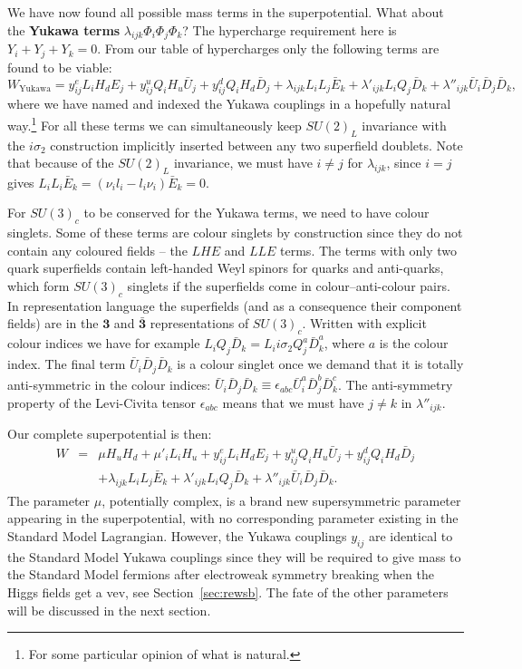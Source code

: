 \documentclass[notes.tex]{subfiles}
\begin{document}
We have now found all possible mass terms in the superpotential. What about the {\bf Yukawa terms} $\lambda_{ijk}\Phi_i\Phi_j\Phi_k$? The hypercharge requirement here is $Y_i + Y_j + Y_k = 0$. From our table of hypercharges only the following terms are found to be viable:
\[W_\text{Yukawa}=y^e_{ij}L_iH_d E_j + y^u_{ij}Q_iH_u\bar{U}_j +  y^d_{ij}Q_iH_d\bar{D}_j+ \lambda_{ijk} L_iL_j\bar{E}_k + \lambda'_{ijk} L_iQ_j\bar{D}_k + \lambda''_{ijk}\bar{U}_i\bar{D}_j\bar{D}_k,\]
where we have named and indexed the Yukawa couplings in a hopefully natural way.\footnote{For some particular opinion of what is natural.} 
For all these terms we can simultaneously keep $SU(2)_L$ invariance with the $i\sigma_2$ construction implicitly inserted between any two superfield doublets.  Note that because of the $SU(2)_L$  invariance, we must have $i\ne j$ for  $\lambda_{ijk}$, since $i=j$ gives $ L_iL_i\bar{E}_k =(\nu_i l_i- l_i\nu_i)\bar E_k=0$.

For $SU(3)_c$ to be conserved for the Yukawa terms, we need to have colour singlets. Some of these terms are colour singlets by construction since they do not contain any coloured fields -- the $LHE$ and $LLE$ terms. The terms with only two quark superfields contain left-handed Weyl spinors for quarks and anti-quarks, which form $SU(3)_c$ singlets if the superfields come in colour--anti-colour pairs. In representation language the superfields (and as a consequence their component fields) are in the $\mathbf 3$ and $\mathbf{\bar 3}$ representations of $SU(3)_c$. Written with explicit  colour indices we have for example $L_i Q_j \bar{D}_k= L_i i\sigma_2 Q_j^a \bar{D}_k^a$, where $a$ is the colour index. The final term $\bar{U}_i\bar{D}_j\bar{D}_k$ is a colour singlet once we demand that it is totally anti-symmetric in the colour indices: $\bar{U}_i\bar{D}_j\bar{D}_k\equiv\epsilon_{abc}\bar{U}_i^a\bar{D}_j^b\bar{D}_k^c$. The anti-symmetry property of the Levi-Civita tensor $\epsilon_{abc}$ means that we must have $j\ne k$ in $ \lambda''_{ijk}$.

Our complete superpotential is then:
\begin{eqnarray}
\label{eq:supolag}
W &=& \mu H_u H_d + \mu'_i L_iH_u + y^e_{ij}L_iH_d E_j + y^u_{ij}Q_iH_u\bar{U}_j +  y^d_{ij}Q_iH_d\bar{D}_j \nonumber\\
&&+ \lambda_{ijk} L_iL_j\bar{E}_k + \lambda'_{ijk} L_iQ_j\bar{D}_k + \lambda''_{ijk}\bar{U}_i\bar{D}_j\bar{D}_k.
\end{eqnarray}
The parameter $\mu$, potentially complex, is a brand new supersymmetric parameter appearing in the superpotential, with no corresponding parameter existing in the Standard Model Lagrangian. However, the Yukawa couplings $y_{ij}$ are identical to the Standard Model Yukawa couplings since they will be required to give mass to the Standard Model fermions after electroweak symmetry breaking when the Higgs fields get a vev, see Section~\ref{sec:rewsb}. The fate of the other parameters will be discussed in the next section.
\end{document}

